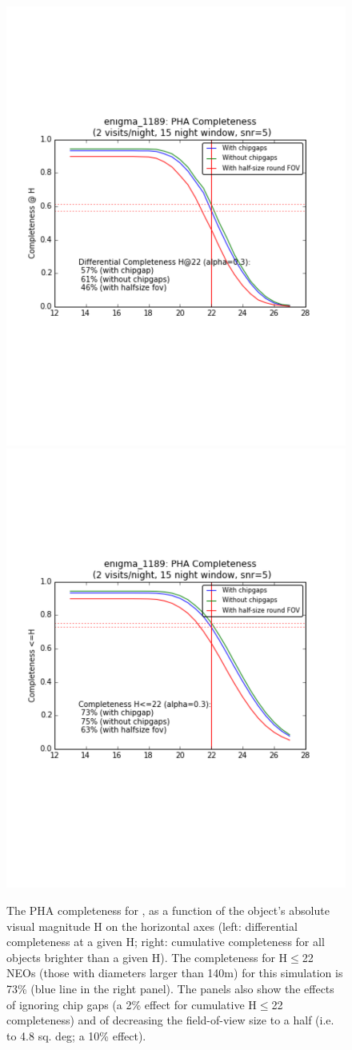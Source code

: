 \begin{figure}[t!]
\vskip -1.1in
\includegraphics[angle=0,width=0.56\hsize:,clip]{figs/enigma1189_diffNEOcompleteness.pdf}
\hskip -0.5in
\includegraphics[angle=0,width=0.56\hsize:,clip]{figs/enigma1189_cumNEOcompleteness.pdf}
\vskip -1.2in
\caption{The PHA completeness for , as a function of the object's absolute
visual magnitude H on the horizontal axes (left: differential completeness at a given H;
right: cumulative completeness for all objects brighter than a given H).
The completeness for H$\le$22 NEOs (those with diameters larger than 140m)  for this
simulation is 73\% (blue line in the right panel). The panels also show the effects of ignoring
chip gaps (a 2\% effect for cumulative H$\le$22 completeness) and of decreasing the
field-of-view size to a half (i.e. to 4.8 sq. deg; a 10\% effect).}
\label{fig:enigmaNEO}
\end{figure}

